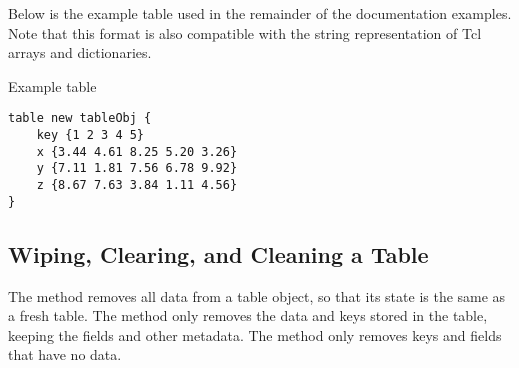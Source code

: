 \documentclass{article}
\begin{document}
Below is the example table used in the remainder of the documentation examples.
Note that this format is also compatible with the string representation of Tcl arrays and dictionaries.
\begin{example}{Example table}
\begin{lstlisting}
table new tableObj {
    key {1 2 3 4 5} 
    x {3.44 4.61 8.25 5.20 3.26}
    y {7.11 1.81 7.56 6.78 9.92}
    z {8.67 7.63 3.84 1.11 4.56}
}
\end{lstlisting}
\end{example}

\subsection{Wiping, Clearing, and Cleaning a Table}
The method  removes all data from a table object, so that its state is the same as a fresh table.
The method  only removes the data and keys stored in the table, keeping the fields and other metadata.
The method  only removes keys and fields that have no data.
\begin{syntax}
\end{syntax}
\begin{syntax}
\end{syntax}
\begin{syntax}
\end{syntax}


\clearpage
\end{document}
